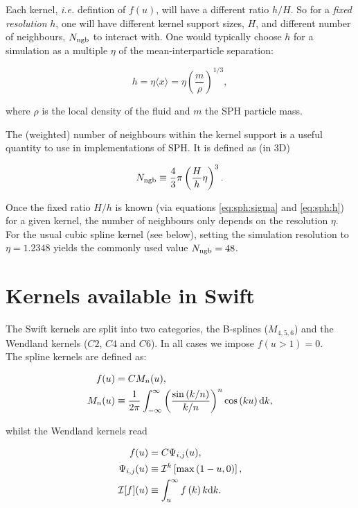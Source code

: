 \documentclass[a4paper]{mnras}
\newcommand{\swift}{{\sc Swift}\xspace}
\begin{document}
Each kernel, {\it i.e.} defintion of $f(u)$, will have a different
ratio $h/H$. So for a \emph{fixed resolution} $h$, one will have
different kernel support sizes, $H$, and different number of
neighbours, $N_{\rm ngb}$ to interact with. One would typically choose
$h$ for a simulation as a multiple $\eta$ of the mean-interparticle
separation:

\begin{equation}
  h = \eta \langle x \rangle = \eta \left(\frac{m}{\rho}\right)^{1/3},
\end{equation}

where $\rho$ is the local density of the fluid and $m$ the SPH
particle mass. 

The (weighted) number of neighbours within the kernel support is a
useful quantity to use in implementations of SPH. It is defined as (in
3D)

\begin{equation}
  N_{\rm ngb} \equiv \frac{4}{3}\pi \left(\frac{H}{h}\eta\right)^3.
\end{equation}

Once the fixed ratio $H/h$ is known (via equations \ref{eq:sph:sigma}
and \ref{eq:sph:h}) for a given kernel, the number of neighbours only
depends on the resolution $\eta$.
For the usual cubic spline kernel (see below), setting the simulation
resolution to $\eta=1.2348$ yields the commonly used value $N_{\rm
  ngb} = 48$.

\section{Kernels available in \swift}

The \swift kernels are split into two categories, the B-splines
($M_{4,5,6}$) and the Wendland kernels ($C2$, $C4$ and $C6$). In all
cases we impose $f(u>1) = 0$.\\

The spline kernels are defined as:

\begin{align}
  f(u) &= C M_n(u), \\
  M_n(u) &\equiv \frac{1}{2\pi}
  \int_{-\infty}^{\infty}
  \left(\frac{\sin\left(k/n\right)}{k/n}\right)^n\cos\left(ku\right){\rm
  d}k,
\end{align}

whilst the Wendland kernels read

\begin{align}
  f(u) &= C \Psi_{i,j}(u), \\
  \Psi_{i,j}(u) &\equiv \mathcal{I}^k\left[\max\left(1-u,0\right)\right],\\
  \mathcal{I}[f](u) &\equiv \int_u^\infty f\left(k\right)k{\rm d}k.
\end{align}
\end{document}
